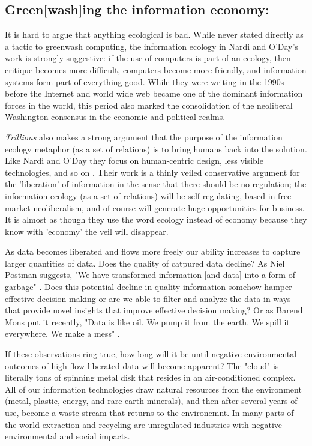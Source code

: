 \subsection{Green[wash]ing the information economy:}

It is hard to argue that anything ecological is bad. While never stated directly as a tactic to greenwash computing, the information ecology in Nardi and O'Day's work is strongly suggestive: if the use of computers is part of an ecology, then critique becomes more difficult, computers become more friendly, and information systems form part of everything good. While they were writing in the 1990s before the Internet and world wide web became one of the dominant information forces in the world, this period also marked the consolidation of the neoliberal Washington consensus in the economic and political realms.

\textit{Trillions} also makes a strong argument that the purpose of the information ecology metaphor (as a set of relations) is to bring humans back into the solution. Like Nardi and O'Day they focus on human-centric design, less visible technologies, and so on \citep{lucas_2012}. Their work is a thinly veiled conservative argument for the 'liberation' of information in the sense that there should be no regulation; the information ecology (as a set of relations) will be self-regulating, based in free-market neoliberalism, and of course will generate huge opportunities for business. It is almost as though they use the word ecology instead of economy because they know with 'economy' the veil will disappear.

As data becomes liberated and flows more freely our ability increases to capture larger quantities of data. Does the quality of catpured data decline? As Niel Postman suggests, "We have transformed information [and data] into a form of garbage" \citep[cited in][p. 50]{stepp_1999}. Does this potential decline in quality information somehow hamper effective decision making or are we able to filter and analyze the data in ways that provide novel insights that improve effective decision making? Or as Barend Mons put it recently, "Data is like oil. We pump it from the earth. We spill it everywhere. We make a mess" \citep{mons_2016}. 

If these observations ring true, how long will it be until negative environmental outcomes of high flow liberated data will become apparent? The "cloud" is literally tons of spinning metal disk that resides in an air-conditioned complex. All of our information technologies draw natural resources from the environment (metal, plastic, energy, and rare earth minerals), and then after several years of use, become a waste stream that returns to the environemnt. In many parts of the world extraction and recycling are unregulated industries with negative environmental and social impacts.

